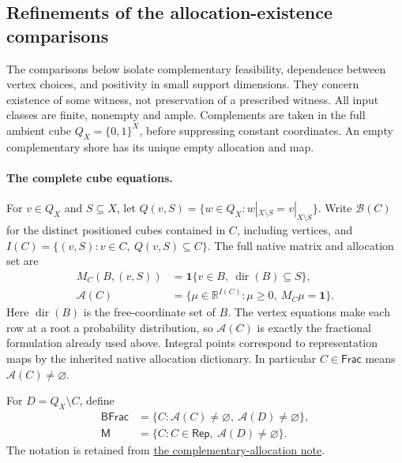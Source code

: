 \subsection{Refinements of the allocation-existence comparisons}
\label{sec:allocation-refinements}

The comparisons below isolate complementary feasibility, dependence between
vertex choices, and positivity in small support dimensions. They concern
existence of some witness, not preservation of a prescribed witness.
All input classes are finite, nonempty and ample. Complements are taken in
the full ambient cube $Q_X=\{0,1\}^X$, before suppressing constant coordinates.
An empty complementary shore has its unique empty allocation and map.

\paragraph{The complete cube equations.}
For $v\in Q_X$ and $S\subseteq X$, let
$Q(v,S)=\{w\in Q_X:w|_{X\setminus S}=v|_{X\setminus S}\}$.
Write $\mathcal B(C)$ for the distinct positioned cubes contained in $C$,
including vertices, and
$I(C)=\{(v,S):v\in C,\ Q(v,S)\subseteq C\}$.
The full native matrix and allocation set are
\begin{align}
 M_C(B,(v,S))&=\mathbf1\{v\in B,\ \operatorname{dir}(B)\subseteq S\},
 \label{eq:refinement-native-matrix}\\
 \mathcal A(C)&=\{\mu\in\mathbb R^{I(C)}:\mu\ge0,\ M_C\mu=\mathbf1\}.
 \label{eq:refinement-allocation-set}
\end{align}
Here $\operatorname{dir}(B)$ is the free-coordinate set of $B$.
The vertex equations make each row at a root a probability distribution,
so $\mathcal A(C)$ is exactly the fractional formulation already used above.
Integral points correspond to representation maps by the inherited native
allocation dictionary. In particular $C\in\mathsf{Frac}$ means
$\mathcal A(C)\ne\varnothing$.

\begin{definition}
\label{def:refinement-mixed}
For $D=Q_X\setminus C$, define
\[
 \begin{aligned}
 \mathsf{BFrac}&=\{C:\mathcal A(C)\ne\varnothing,
                         \ \mathcal A(D)\ne\varnothing\},\\
 \mathsf M&=\{C:C\in\mathsf{Rep},\ \mathcal A(D)\ne\varnothing\}.
 \end{aligned}
\]
The notation is retained from
\href{../containment-bfrac/sections/complementary_pairs.tex}{the complementary-allocation note}.
\end{definition}

